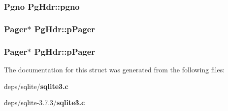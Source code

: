 \subsubsection{\setlength{\rightskip}{0pt plus 5cm}\bf{Pgno} \bf{Pg\-Hdr::pgno}}\label{structPgHdr_5e67d8c2164568a251e39a4f37dcc44b}


\subsubsection{\setlength{\rightskip}{0pt plus 5cm}\bf{Pager}$\ast$ \bf{Pg\-Hdr::p\-Pager}}\label{structPgHdr_2767f7ea96155e7e21cc6873af96e40a}


\subsubsection{\setlength{\rightskip}{0pt plus 5cm}\bf{Pager}$\ast$ \bf{Pg\-Hdr::p\-Pager}}\label{structPgHdr_2767f7ea96155e7e21cc6873af96e40a}




The documentation for this struct was generated from the following files:\begin{CompactItemize}
\item 
deps/sqlite/\bf{sqlite3.c}\item 
deps/sqlite-3.7.3/\bf{sqlite3.c}\end{CompactItemize}
